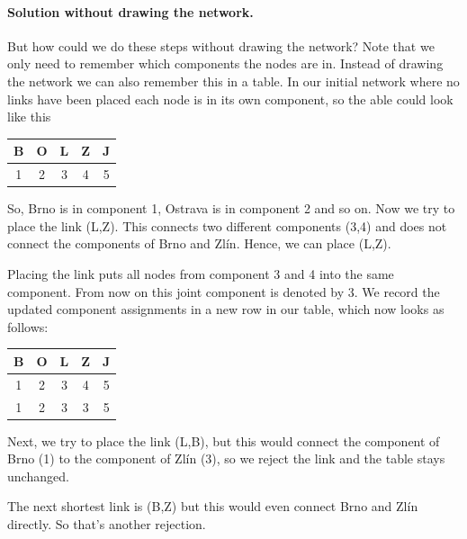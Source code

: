 \paragraph{Solution without drawing the network.}But how could we do these steps without drawing the network? Note that we only need to remember which components the nodes are in. Instead of drawing the network we can also remember this in a table. 
In our initial network where no links have been placed each node is in its own component, so the able could look like this 
\begin{center}
\begin{tabular}{c c c c c}
B & O & L & Z & J \\\hline
1 & 2 & 3 & 4 & 5 
\end{tabular}
\end{center}
So, Brno is in component 1, Ostrava is in component 2 and so on. Now we try to place the link (L,Z). This connects two different components (3,4) and does not connect the components of Brno and Zlín. Hence, we can place (L,Z). 

Placing the link puts all nodes from component 3 and 4 into the same component. From now on this joint component is denoted by 3. We record the updated component assignments in a new row in our table, which now looks as follows: 
\begin{center}
\begin{tabular}{c c c c c}
B & O & L & Z & J \\\hline
1 & 2 & 3 & 4 & 5 \\
1 & 2 & 3 & 3 & 5 
\end{tabular}
\end{center}
Next, we try to place the link (L,B), but this would connect the component of Brno (1) to the component of Zlín (3), so we reject the link and the table stays unchanged.

The next shortest link is (B,Z) but this would even connect Brno and Zlín directly. So that's another rejection.


